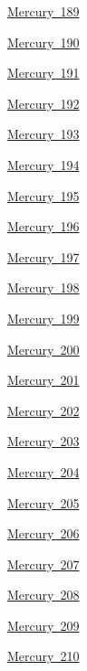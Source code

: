 \begin{DoxyCompactItemize}
\item 
\mbox{\hyperlink{group___isotope_const-_mercury-_hg189}{Mercury 189}}
\item 
\mbox{\hyperlink{group___isotope_const-_mercury-_hg190}{Mercury 190}}
\item 
\mbox{\hyperlink{group___isotope_const-_mercury-_hg191}{Mercury 191}}
\item 
\mbox{\hyperlink{group___isotope_const-_mercury-_hg192}{Mercury 192}}
\item 
\mbox{\hyperlink{group___isotope_const-_mercury-_hg193}{Mercury 193}}
\item 
\mbox{\hyperlink{group___isotope_const-_mercury-_hg194}{Mercury 194}}
\item 
\mbox{\hyperlink{group___isotope_const-_mercury-_hg195}{Mercury 195}}
\item 
\mbox{\hyperlink{group___isotope_const-_mercury-_hg196}{Mercury 196}}
\item 
\mbox{\hyperlink{group___isotope_const-_mercury-_hg197}{Mercury 197}}
\item 
\mbox{\hyperlink{group___isotope_const-_mercury-_hg198}{Mercury 198}}
\item 
\mbox{\hyperlink{group___isotope_const-_mercury-_hg199}{Mercury 199}}
\item 
\mbox{\hyperlink{group___isotope_const-_mercury-_hg200}{Mercury 200}}
\item 
\mbox{\hyperlink{group___isotope_const-_mercury-_hg201}{Mercury 201}}
\item 
\mbox{\hyperlink{group___isotope_const-_mercury-_hg202}{Mercury 202}}
\item 
\mbox{\hyperlink{group___isotope_const-_mercury-_hg203}{Mercury 203}}
\item 
\mbox{\hyperlink{group___isotope_const-_mercury-_hg204}{Mercury 204}}
\item 
\mbox{\hyperlink{group___isotope_const-_mercury-_hg205}{Mercury 205}}
\item 
\mbox{\hyperlink{group___isotope_const-_mercury-_hg206}{Mercury 206}}
\item 
\mbox{\hyperlink{group___isotope_const-_mercury-_hg207}{Mercury 207}}
\item 
\mbox{\hyperlink{group___isotope_const-_mercury-_hg208}{Mercury 208}}
\item 
\mbox{\hyperlink{group___isotope_const-_mercury-_hg209}{Mercury 209}}
\item 
\mbox{\hyperlink{group___isotope_const-_mercury-_hg210}{Mercury 210}}
\item 

\end{DoxyCompactItemize}
